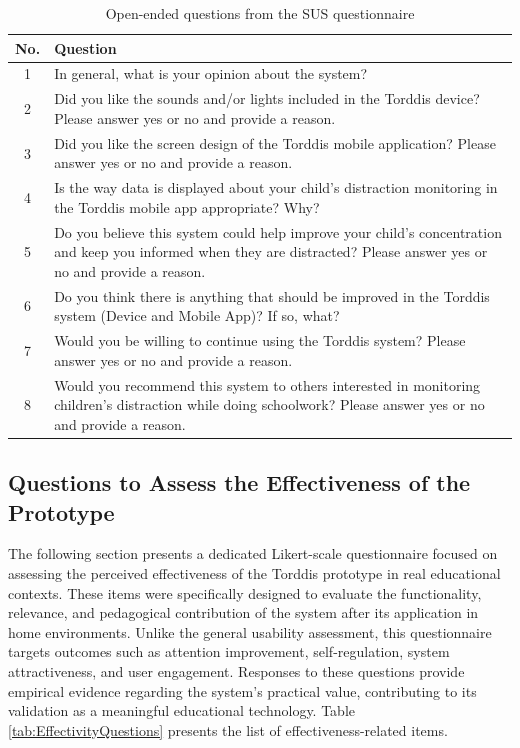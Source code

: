 			\begin{table}[h]
				\centering
				\caption{Open-ended questions from the SUS questionnaire \label{tab:OpenQuestion}}
				\begin{tabularx}{\textwidth}{c X}
					\toprule
					\textbf{No.} & \textbf{Question}\\
					\midrule
					1 & In general, what is your opinion about the system?\\
					2 & Did you like the sounds and/or lights included in the Torddis device? Please answer yes or no and provide a reason.\\
					3 & Did you like the screen design of the Torddis mobile application? Please answer yes or no and provide a reason.\\
					4 & Is the way data is displayed about your child’s distraction monitoring in the Torddis mobile app appropriate? Why?\\
					5 & Do you believe this system could help improve your child’s concentration and keep you informed when they are distracted? Please answer yes or no and provide a reason.\\
					6 & Do you think there is anything that should be improved in the Torddis system (Device and Mobile App)? If so, what?\\
					7 & Would you be willing to continue using the Torddis system? Please answer yes or no and provide a reason.\\
					8 & Would you recommend this system to others interested in monitoring children’s distraction while doing schoolwork? Please answer yes or no and provide a reason.\\
					\bottomrule
				\end{tabularx}
			\end{table}
			
		\subsection{Questions to Assess the Effectiveness of the Prototype} \label{Appendix:LikertEffectivity}
			The following section presents a dedicated Likert-scale questionnaire focused on assessing the perceived effectiveness of the Torddis prototype in real educational contexts. These items were specifically designed to evaluate the functionality, relevance, and pedagogical contribution of the system after its application in home environments. Unlike the general usability assessment, this questionnaire targets outcomes such as attention improvement, self-regulation, system attractiveness, and user engagement. Responses to these questions provide empirical evidence regarding the system’s practical value, contributing to its validation as a meaningful educational technology. Table \ref{tab:EffectivityQuestions} presents the list of effectiveness-related items.
			
